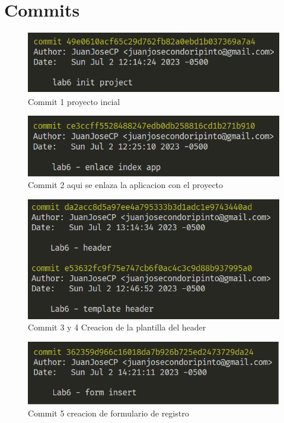 \documentclass{article}
\begin{document}
\section{Commits}    
    \begin{figure}
        \centering
        \includegraphics[width=150mm]{img/commit1.png}
        \caption{Commit 1 proyecto incial}
        \label{fig:enter-label}
    \end{figure}
    \begin{figure}
        \centering
        \includegraphics[width=150mm]{img/commit2.png}
        \caption{Commit 2 aqui se enlaza la aplicacion con el proyecto}
        \label{fig:enter-label}
    \end{figure}
    \begin{figure}
        \centering
        \includegraphics[width=150mm]{img/commit3.png}
        \caption{Commit 3 y 4 Creacion de la plantilla del header}
        \label{fig:enter-label}
    \end{figure}
    \begin{figure}
        \centering
        \includegraphics[width=150mm]{img/commit4.png}
        \caption{Commit 5 creacion de formulario de registro}
        \label{fig:enter-label}
    \end{figure}
\end{document}
